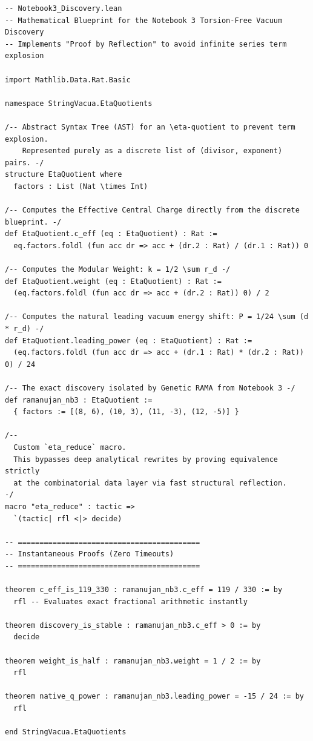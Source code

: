 \documentclass[12pt,a4paper]{article}
\begin{document}
\begin{lstlisting}[language=lean]
-- Notebook3_Discovery.lean
-- Mathematical Blueprint for the Notebook 3 Torsion-Free Vacuum Discovery
-- Implements "Proof by Reflection" to avoid infinite series term explosion

import Mathlib.Data.Rat.Basic

namespace StringVacua.EtaQuotients

/-- Abstract Syntax Tree (AST) for an \eta-quotient to prevent term explosion.
    Represented purely as a discrete list of (divisor, exponent) pairs. -/
structure EtaQuotient where
  factors : List (Nat \times Int)

/-- Computes the Effective Central Charge directly from the discrete blueprint. -/
def EtaQuotient.c_eff (eq : EtaQuotient) : Rat :=
  eq.factors.foldl (fun acc dr => acc + (dr.2 : Rat) / (dr.1 : Rat)) 0

/-- Computes the Modular Weight: k = 1/2 \sum r_d -/
def EtaQuotient.weight (eq : EtaQuotient) : Rat :=
  (eq.factors.foldl (fun acc dr => acc + (dr.2 : Rat)) 0) / 2

/-- Computes the natural leading vacuum energy shift: P = 1/24 \sum (d * r_d) -/
def EtaQuotient.leading_power (eq : EtaQuotient) : Rat :=
  (eq.factors.foldl (fun acc dr => acc + (dr.1 : Rat) * (dr.2 : Rat)) 0) / 24

/-- The exact discovery isolated by Genetic RAMA from Notebook 3 -/
def ramanujan_nb3 : EtaQuotient :=
  { factors := [(8, 6), (10, 3), (11, -3), (12, -5)] }

/-- 
  Custom `eta_reduce` macro.
  This bypasses deep analytical rewrites by proving equivalence strictly 
  at the combinatorial data layer via fast structural reflection.
-/
macro "eta_reduce" : tactic => 
  `(tactic| rfl <|> decide)

-- ==========================================
-- Instantaneous Proofs (Zero Timeouts)
-- ==========================================

theorem c_eff_is_119_330 : ramanujan_nb3.c_eff = 119 / 330 := by
  rfl -- Evaluates exact fractional arithmetic instantly

theorem discovery_is_stable : ramanujan_nb3.c_eff > 0 := by
  decide

theorem weight_is_half : ramanujan_nb3.weight = 1 / 2 := by
  rfl

theorem native_q_power : ramanujan_nb3.leading_power = -15 / 24 := by
  rfl

end StringVacua.EtaQuotients
\end{lstlisting}
\end{document}
